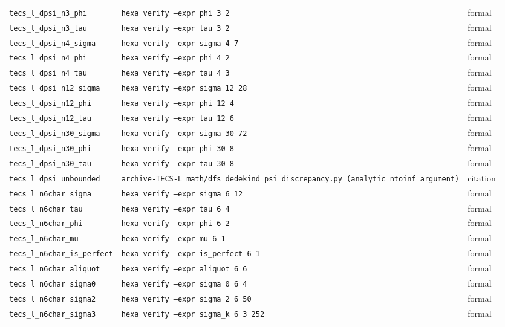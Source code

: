 \documentclass[11pt,a4paper]{article}
\theoremstyle{definition}
\begin{document}
\begin{longtable}{lll}
\texttt{tecs\_l\_dpsi\_n3\_phi} & \texttt{hexa verify --expr phi 3 2} & formal \\
\texttt{tecs\_l\_dpsi\_n3\_tau} & \texttt{hexa verify --expr tau 3 2} & formal \\
\texttt{tecs\_l\_dpsi\_n4\_sigma} & \texttt{hexa verify --expr sigma 4 7} & formal \\
\texttt{tecs\_l\_dpsi\_n4\_phi} & \texttt{hexa verify --expr phi 4 2} & formal \\
\texttt{tecs\_l\_dpsi\_n4\_tau} & \texttt{hexa verify --expr tau 4 3} & formal \\
\texttt{tecs\_l\_dpsi\_n12\_sigma} & \texttt{hexa verify --expr sigma 12 28} & formal \\
\texttt{tecs\_l\_dpsi\_n12\_phi} & \texttt{hexa verify --expr phi 12 4} & formal \\
\texttt{tecs\_l\_dpsi\_n12\_tau} & \texttt{hexa verify --expr tau 12 6} & formal \\
\texttt{tecs\_l\_dpsi\_n30\_sigma} & \texttt{hexa verify --expr sigma 30 72} & formal \\
\texttt{tecs\_l\_dpsi\_n30\_phi} & \texttt{hexa verify --expr phi 30 8} & formal \\
\texttt{tecs\_l\_dpsi\_n30\_tau} & \texttt{hexa verify --expr tau 30 8} & formal \\
\texttt{tecs\_l\_dpsi\_unbounded} & \texttt{archive-TECS-L math/dfs\_dedekind\_psi\_discrepancy.py (analytic ntoinf argument)} & citation \\
\texttt{tecs\_l\_n6char\_sigma} & \texttt{hexa verify --expr sigma 6 12} & formal \\
\texttt{tecs\_l\_n6char\_tau} & \texttt{hexa verify --expr tau 6 4} & formal \\
\texttt{tecs\_l\_n6char\_phi} & \texttt{hexa verify --expr phi 6 2} & formal \\
\texttt{tecs\_l\_n6char\_mu} & \texttt{hexa verify --expr mu 6 1} & formal \\
\texttt{tecs\_l\_n6char\_is\_perfect} & \texttt{hexa verify --expr is\_perfect 6 1} & formal \\
\texttt{tecs\_l\_n6char\_aliquot} & \texttt{hexa verify --expr aliquot 6 6} & formal \\
\texttt{tecs\_l\_n6char\_sigma0} & \texttt{hexa verify --expr sigma\_0 6 4} & formal \\
\texttt{tecs\_l\_n6char\_sigma2} & \texttt{hexa verify --expr sigma\_2 6 50} & formal \\
\texttt{tecs\_l\_n6char\_sigma3} & \texttt{hexa verify --expr sigma\_k 6 3 252} & formal \\

\end{longtable}
\end{document}
